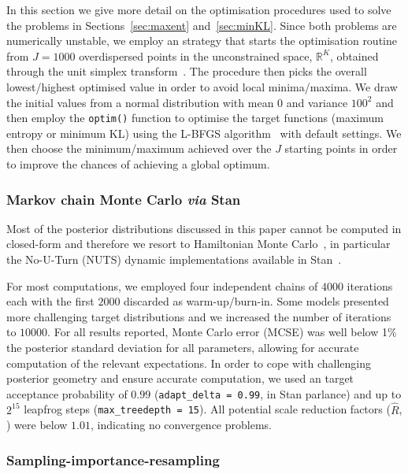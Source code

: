 \documentclass[a4paper, notitlepage, 11pt]{article}
\begin{document}
In this section we give more detail on the optimisation procedures used to solve the problems in Sections~\ref{sec:maxent} and~\ref{sec:minKL}.
Since both problems are numerically unstable, we employ an strategy that starts the optimisation routine from $J = 1000$ overdispersed points in the unconstrained space, $\mathbb{R}^K$, obtained through the unit simplex transform~\citep{Betancourt2012}.
The procedure then picks the overall lowest/highest optimised value in order to avoid local minima/maxima.
We draw the initial values from a normal distribution with mean $0$ and variance $100^2$ and then employ the \verb|optim()| function to optimise the target functions (maximum entropy or minimum KL) using the L-BFGS algorithm~\citep{Byrd1995} with default settings.
We then choose the minimum/maximum achieved over the $J$ starting points in order to improve the chances of achieving a global optimum.

\subsubsection{Markov chain Monte Carlo \textit{via} Stan}
\label{sec:computation_mcmc}

Most of the posterior distributions discussed in this paper cannot be computed in closed-form and therefore we resort to Hamiltonian Monte Carlo~\citep{Neal2011}, in particular the No-U-Turn (NUTS) dynamic implementations available in Stan~\citep{Hoffman2014,Betancourt2017}.

For most computations, we employed four independent chains of $4000$ iterations each with the first $2000$ discarded as warm-up/burn-in.
Some models presented more challenging target distributions and we increased the number of iterations to $10 000$.
For all results reported, Monte Carlo error (MCSE) was well below 1\% the posterior standard deviation for all parameters, allowing for accurate computation of the relevant expectations.
In order to cope with challenging posterior geometry and ensure accurate computation, we used an target  acceptance probability of $0.99$ (\verb|adapt_delta = 0.99|, in Stan parlance) and up to $2^{15}$ leapfrog steps (\verb|max_treedepth = 15|).
All potential scale reduction factors ($\hat{R}$, \cite{Gelman1992}) were below $1.01$, indicating no convergence problems.

\subsubsection{Sampling-importance-resampling}
\label{sec:spIR}
\end{document}
